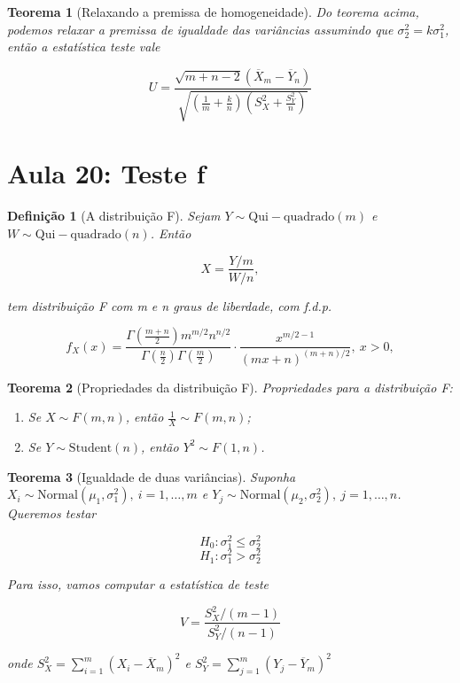 \documentclass{article}
\newtheorem{theorem}{Teorema}
\newtheorem{definition}{Definição}
\begin{document}
\begin{theorem}[Relaxando a premissa de homogeneidade]
Do teorema acima, podemos relaxar a premissa de igualdade das variâncias assumindo que $\sigma_2^2 = k \sigma_1^2$, então a estatística teste vale

$$U = \frac{\sqrt{m + n - 2} (\overline{X}_m - \overline{Y}_n)}{\sqrt{(\frac{1}{m} + \frac{k}{n})(S_X^2 + \frac{S_Y^2}{n})}}$$
\end{theorem}

\section*{Aula 20: Teste f}\label{s20}
\begin{definition}[A distribuição F]
Sejam $Y \sim \mathrm{Qui-quadrado}(m)$ e $W \sim \mathrm{Qui-quadrado}(n)$. Então

$$X = \frac{Y / m}{W / n},$$

tem distribuição F com m e n graus de liberdade, com f.d.p.

$$f_X (x) = \frac{\Gamma(\frac{m + n}{2}) m^{m/2} n^{n/2}}{\Gamma(\frac{n}{2}) \Gamma(\frac{m}{2})} \cdot \frac{x^{m / 2 - 1}}{(mx + n)^{(m + n)/2}}, \ x > 0,$$
\end{definition}

\begin{theorem}[Propriedades da distribuição F] Propriedades para a distribuição F:

\begin{enumerate}
    \item Se $X \sim F(m, n)$, então $\frac{1}{X} \sim F(m, n)$;
    
    \item Se $Y \sim \mathrm{Student}(n)$, então $Y^2 \sim F(1, n)$.
\end{enumerate}
\end{theorem}

\begin{theorem}[Igualdade de duas variâncias]
Suponha $X_i \sim \mathrm{Normal}(\mu_1, \sigma_1^2), \ i = 1, \ldots, m$ e $Y_j \sim \mathrm{Normal}(\mu_2, \sigma_2^2), \ j = 1, \ldots, n$. Queremos testar

$$H_0 : \sigma_1^2 \leq \sigma_2^2$$
$$H_1 : \sigma_1^2 > \sigma_2^2$$

Para isso, vamos computar a estatística de teste

$$V = \frac{S_X^2 / (m - 1)}{S_Y^2 / (n - 1)}$$

onde $S_X^2 = \sum_{i = 1}^m (X_i - \overline{X}_m)^2$ e $S_Y^2 = \sum_{j = 1}^m (Y_j - \overline{Y}_m)^2$
\end{theorem}
\end{document}
